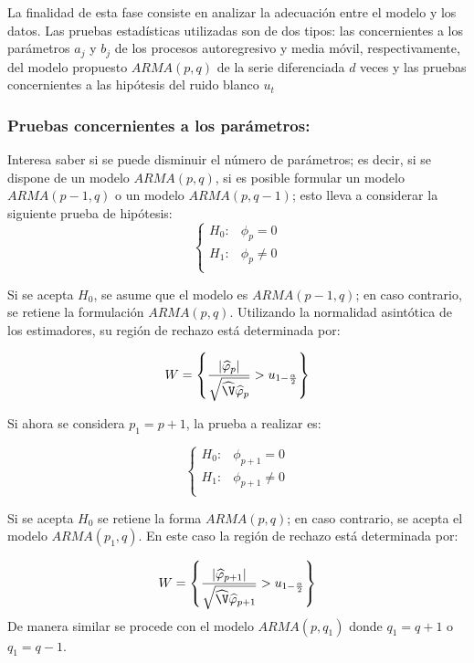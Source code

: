 La finalidad de esta fase consiste en analizar la adecuaci\'{o}n entre el modelo y los datos. Las pruebas estad\'{i}sticas utilizadas son de dos tipos: las concernientes a los par\'{a}metros $a_{j}$ y $b_{j}$ de los procesos autoregresivo y media m\'{o}vil, respectivamente, del modelo propuesto $ARMA(p,q)$ de la serie diferenciada $d$ veces y las pruebas concernientes a las hip\'{o}tesis del ruido blanco $u_{t}$

\subsubsection{Pruebas concernientes a los par\'{a}metros:}

Interesa saber si se puede disminuir el n\'{u}mero de par\'{a}metros; es decir, si se dispone de un modelo $ARMA(p,q)$, si es posible formular un modelo $ARMA(p-1,  q)$ o un modelo $ARMA  (p,q-1)$; esto lleva a considerar la siguiente prueba de hip\'{o}tesis:
\[
\begin{cases}
 H_0:& \phi_{p} =0 \\ 
 H_{1} :& \phi_{p} \ne 0 \\ 
\end{cases}
\]

Si se acepta $H_{0}$, se asume que el modelo es $ARMA(p-1,  q)$; en caso contrario, se retiene la formulaci\'{o}n $ARMA(p,q)$. Utilizando la normalidad asint\'{o}tica de los estimadores, su regi\'{o}n de rechazo est\'{a} determinada por:

\[
W=\left\{ {\frac{\left| {\widehat{\varphi}_{p} } \right|}{\sqrt {\widehat{\V}\widehat{\varphi}_{p} } }>u_{1-\frac{\alpha }{2}} } \right\}
\]

Si ahora se considera $p_{1} = p+1$, la prueba a realizar es: 

\[
\begin{cases}
 H_0:& \phi_{p+1} =0 \\ 
 H_{1} :& \phi_{p+1} \ne 0 \\ 
\end{cases}
\]

Si se acepta $H_{0}$ se retiene la forma $ARMA (p, q)$; en caso contrario, se acepta el modelo $ARMA (p_{1}, q)$. En este caso la regi\'{o}n de rechazo est\'{a} determinada por:

\[
W=\left\{ {\frac{\left| {\widehat{\varphi}_{p+1} } \right|}{\sqrt 
{\widehat{\V}\widehat{\varphi}_{p+1} } }>u_{1-\frac{\alpha 
}{2}} } \right\}
\]
De manera similar se procede con el modelo $ARMA (p , q_{1} )$ donde $q_{1} = q + 1$ o $q_{1} = q - 1$.

